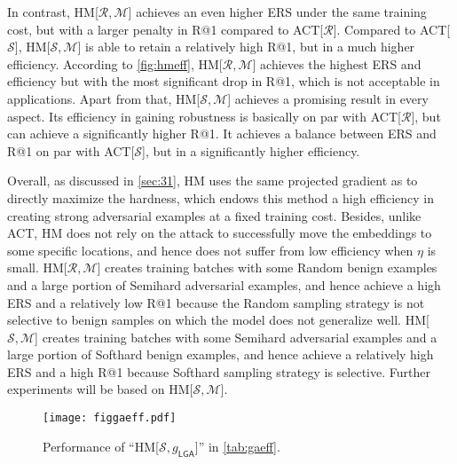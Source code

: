 \documentclass[10pt,twocolumn,letterpaper]{article}
\begin{document}

In contrast, HM[$\mathcal{R},\mathcal{M}$] achieves an even higher ERS under
the same training cost, but with a larger penalty in R@1 compared to
ACT[$\mathcal{R}$].
%
Compared to ACT[$\mathcal{S}$], HM[$\mathcal{S},\mathcal{M}$] is able to retain
a relatively high R@1, but in a much higher efficiency.
%
According to \cref{fig:hmeff}, HM[$\mathcal{R},\mathcal{M}$] achieves the
highest ERS and efficiency but with the most significant drop in R@1, which is
not acceptable in applications.
%
Apart from that, HM[$\mathcal{S},\mathcal{M}$] achieves a promising result
in every aspect.
%
Its efficiency in gaining robustness is basically on par with
ACT[$\mathcal{R}$], but can achieve a significantly higher R@1.
%
It achieves a balance between ERS and R@1 on par with ACT[$\mathcal{S}$], but
in a significantly higher efficiency.





Overall, as discussed in \cref{sec:31}, HM uses the same projected gradient as
to directly maximize the hardness, which endows this method a high efficiency
in creating strong adversarial examples at a fixed training cost.
%
Besides, unlike ACT, HM does not rely on the attack to successfully move the
embeddings to some specific locations, and hence does not suffer from low
efficiency when $\eta$ is small.
%
HM[$\mathcal{R},\mathcal{M}$] creates training batches with some Random benign
examples and a large portion of Semihard adversarial examples, and hence
achieve a high ERS and a relatively low R@1 because the Random sampling
strategy is not selective to benign samples on which the model does not generalize well.
%
HM[$\mathcal{S},\mathcal{M}$] creates training batches with some Semihard
adversarial examples and a large portion of Softhard benign examples, and hence
achieve a relatively high ERS and a high R@1 because Softhard sampling
strategy is selective.
%
Further experiments will be based on HM[$\mathcal{S},\mathcal{M}$].

\begin{figure}[t]
	\vspace{-1em}
	\texttt{[image: figgaeff.pdf]}
	\vspace{-1.9em}
	\caption{Performance of ``HM[$\mathcal{S},g_\mathsf{LGA}$]'' in
	\cref{tab:gaeff}.}
	\label{fig:gaeff}
\end{figure}
\end{document}

